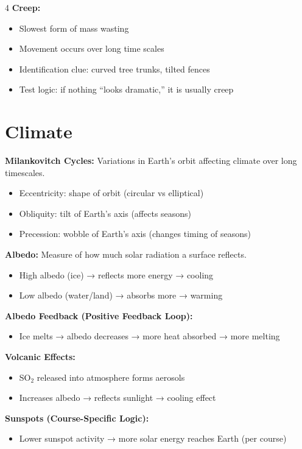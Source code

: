 \documentclass[10pt]{article}
\begin{document}
\begin{multicols}{4}
\textbf{Creep:}
\begin{itemize}
\item Slowest form of mass wasting
\item Movement occurs over long time scales
\item Identification clue: curved tree trunks, tilted fences
\item Test logic: if nothing “looks dramatic,” it is usually creep
\end{itemize}

\section*{Climate}

\textbf{Milankovitch Cycles:}
Variations in Earth's orbit affecting climate over long timescales.
\begin{itemize}
\item Eccentricity: shape of orbit (circular vs elliptical)
\item Obliquity: tilt of Earth's axis (affects seasons)
\item Precession: wobble of Earth's axis (changes timing of seasons)
\end{itemize}

\textbf{Albedo:}
Measure of how much solar radiation a surface reflects.
\begin{itemize}
\item High albedo (ice) → reflects more energy → cooling
\item Low albedo (water/land) → absorbs more → warming
\end{itemize}

\textbf{Albedo Feedback (Positive Feedback Loop):}
\begin{itemize}
\item Ice melts → albedo decreases → more heat absorbed → more melting
\end{itemize}

\textbf{Volcanic Effects:}
\begin{itemize}
\item SO$_2$ released into atmosphere forms aerosols
\item Increases albedo → reflects sunlight → cooling effect
\end{itemize}

\textbf{Sunspots (Course-Specific Logic):}
\begin{itemize}
\item Lower sunspot activity → more solar energy reaches Earth (per course)
\end{itemize}


\end{multicols}
\end{document}
